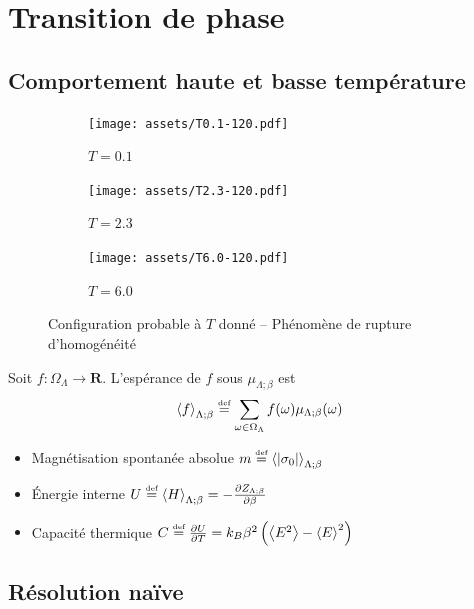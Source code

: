 \documentclass[french]{beamer}
\newcommand\eqdef{\overset{\mbox{\tiny def}}{=}}
\begin{document}
\section{Transition de phase}
\subsection{Comportement haute et basse température}
\begin{frame}

\begin{figure}
	\begin{subfigure}{0.3\textwidth}
		\texttt{[image: assets/T0.1-120.pdf]}
		\caption{$T= 0.1$}
	\end{subfigure}
	\begin{subfigure}{0.3\textwidth}
		\texttt{[image: assets/T2.3-120.pdf]}
		\caption{$T= 2.3$}
	\end{subfigure}
	\begin{subfigure}{0.3\textwidth}
		\texttt{[image: assets/T6.0-120.pdf]}
		\caption{$T= 6.0$}
	\end{subfigure}
	\caption{Configuration probable à $T$ donné -- Phénomène de rupture d'homogénéité}
\end{figure}

\end{frame}


\begin{frame}
\begin{definition}[Espérance]
    Soit $f : \Omega_\Lambda \to \mathbf{R}$. L'espérance de $f$ sous $\mu_{\Lambda;\beta}$ est
    \[ \left\langle f \right\rangle_{\Lambda;\beta} \eqdef \sum_{\omega \in \Omega_\Lambda} f(\omega)\mu_{\Lambda;\beta}(\omega)\]
\end{definition}

\begin{itemize}
	\item  Magnétisation spontanée absolue $m \eqdef \left< \left| \sigma_0 \right| \right>_{\Lambda;\beta}$
	\item \'Energie interne $U \eqdef \left< H \right>_{\Lambda;\beta} = - \frac{\partial Z_{\Lambda;\beta}}{\partial \beta}$
	\item Capacité thermique $C \eqdef \frac{\partial U}{\partial T} = k_B\beta^2 \left(\left<E^2\right> -  \left<E\right>^2\right)$
\end{itemize}
\end{frame}

%
\subsection{Résolution naïve}
%
\end{document}
